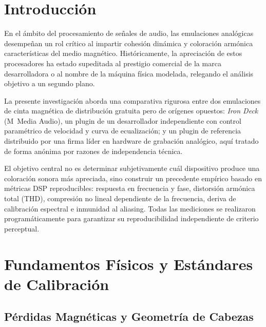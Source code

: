\documentclass[10pt,conference]{IEEEtran}
\begin{document}
\section{Introducción}

En el ámbito del procesamiento de señales de audio, las emulaciones analógicas desempeñan un
rol crítico al impartir cohesión dinámica y coloración armónica características del medio
magnético. Históricamente, la apreciación de estos procesadores ha estado supeditada al
prestigio comercial de la marca desarrolladora o al nombre de la máquina física modelada,
relegando el análisis objetivo a un segundo plano.

La presente investigación aborda una comparativa rigurosa entre dos emulaciones de cinta
magnética de distribución gratuita pero de orígenes opuestos: \emph{Iron Deck} (M~Media
Audio), un plugin de un desarrollador independiente con control paramétrico de velocidad y
curva de ecualización; y un plugin de referencia distribuido por una firma líder en hardware
de grabación analógico, aquí tratado de forma anónima por razones de independencia técnica.

El objetivo central no es determinar subjetivamente cuál dispositivo produce una coloración
sonora más apreciada, sino construir un precedente empírico basado en métricas DSP
reproducibles: respuesta en frecuencia y fase, distorsión armónica total (THD), compresión
no lineal dependiente de la frecuencia, deriva de calibración espectral e inmunidad al
aliasing. Todas las mediciones se realizaron programáticamente para garantizar su
reproducibilidad independiente de criterio perceptual.

\section{Fundamentos Físicos y Estándares de Calibración}

\subsection{Pérdidas Magnéticas y Geometría de Cabezas}
\end{document}
